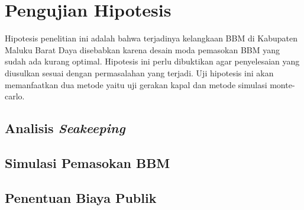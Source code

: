 \section{Pengujian Hipotesis}
\label{sec:uji-hipotesis}

Hipotesis penelitian ini adalah bahwa terjadinya kelangkaan BBM di Kabupaten Maluku Barat Daya disebabkan karena desain moda pemasokan BBM yang sudah ada kurang optimal. Hipotesis ini perlu dibuktikan agar penyelesaian yang diusulkan sesuai dengan permasalahan yang terjadi. Uji hipotesis ini akan memanfaatkan dua metode yaitu uji gerakan kapal dan metode simulasi monte-carlo.

\subsection{Analisis \emph{Seakeeping}}
\label{subsec:analisis-seakeeping}



\subsection{Simulasi Pemasokan BBM}
\label{subsec:metode-simul-bbm}


\subsection{Penentuan Biaya Publik}
\label{subsec:awal-biaya-publik}
